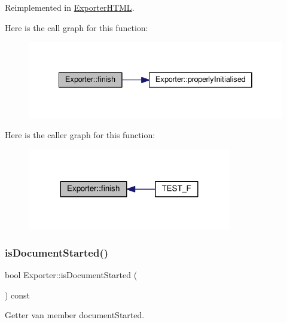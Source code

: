 Reimplemented in \hyperlink{class_exporter_h_t_m_l_aefa1c658f3c3c55bd7725bdad09629b3}{Exporter\+H\+T\+ML}.

Here is the call graph for this function\+:\nopagebreak
\begin{figure}[H]
\begin{center}
\leavevmode
\includegraphics[width=334pt]{class_exporter_ae477714f462d70cfc5b3970f91fcc4ed_cgraph}
\end{center}
\end{figure}
Here is the caller graph for this function\+:\nopagebreak
\begin{figure}[H]
\begin{center}
\leavevmode
\includegraphics[width=252pt]{class_exporter_ae477714f462d70cfc5b3970f91fcc4ed_icgraph}
\end{center}
\end{figure}
\mbox{\label{class_exporter_a3ef5b88b982577090f4960fabae518c1}} 
\subsubsection{\texorpdfstring{is\+Document\+Started()}{isDocumentStarted()}}
{\footnotesize\ttfamily bool Exporter\+::is\+Document\+Started (\begin{DoxyParamCaption}{ }\end{DoxyParamCaption}) const}



Getter van member document\+Started. 

